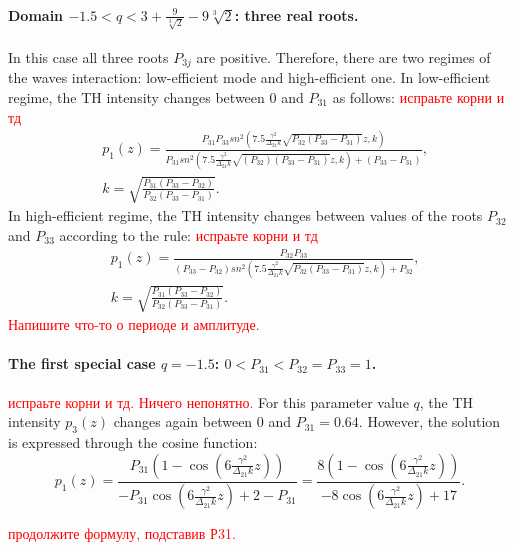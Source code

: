 \documentclass[a4paper, 12pt, onecolumn]{extarticle}
\begin{document}
\paragraph*{Domain $-1.5<q<3 + \frac{9}{\sqrt[3]{2}}-9\sqrt[3]{ 2}$: three real roots.} 
In this case all three roots $P_{3j}$ are positive. Therefore, there are two regimes of the waves interaction: low-efficient mode and high-efficient one. In low-efficient regime, the TH intensity changes between $0$ and $P_{31}$ as follows: \textcolor{red}{испраьте корни и тд}
\begin{equation}
\label{eq:p1_2}
\begin{aligned}
&p_1(z)=\frac{P_{31}P_{33}sn^2(7.5\frac{\gamma^2}{\Delta_{21}k}\sqrt{P_{32}(P_{33}-P_{31})}z,k)}{P_{31}sn^2(7.5\frac{\gamma^2}{\Delta_{21}k} \sqrt{(P_{32})(P_{33}-P_{31})}z,k)+(P_{33}-P_{31})},\\
&k=\sqrt{\frac{P_{31}(P_{33}-P_{32})}{P_{32}(P_{33}-P_{31})}}.
\end{aligned}
\end{equation} 
In high-efficient regime, the TH intensity changes between values of the roots $P_{32}$ and $P_{33}$ according to the rule:
\textcolor{red}{испраьте корни и тд}
\begin{equation}
\label{eq:p1_2bis}
\begin{aligned}
&p_1(z)=\frac{P_{32}P_{33}}{(P_{33}-P_{32})sn^2(7.5\frac{\gamma^2}{\Delta_{21}k}\sqrt{P_{32}(P_{33}-P_{31})}z,k)+P_{32}},\\
&k=\sqrt{\frac{P_{31}(P_{33}-P_{32})}{P_{32}(P_{33}-P_{31})}}.
\end{aligned}
\end{equation}
\textcolor{red}{Напишите что-то о периоде и амплитуде.}
\paragraph*{The first special case $q=-1.5$: $0<P_{31}<P_{32}=P_{33}=1$.}
\textcolor{red}{испраьте корни и тд. Ничего непонятно.}
For this parameter value  $q$, the TH intensity $p_3(z)$  changes again between $0$ and $P_{31}=0.64$. However, the solution is expressed through the cosine function:
\begin{equation}
\label{eq:p1_3}
p_1(z)=\frac{P_{31}(1-\cos(6\frac{\gamma^2}{\Delta_{21}k}z))}{-P_{31}\cos(6\frac{\gamma^2}{\Delta_{21}k}z)+2-P_{31}}=\frac{8(1-\cos(6\frac{\gamma^2}{\Delta_{21}k}z))}{-8\cos(6\frac{\gamma^2}{\Delta_{21}k}z)+17}.
\end{equation}

\textcolor{red}{продолжите формулу, подставив Р31.}
\end{document}
